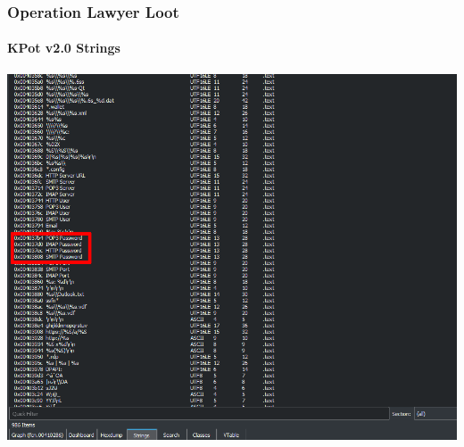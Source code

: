 \documentclass[aspectratio=169]{beamer}
\begin{document}
{
\begin{frame}
  \frametitle{Operation Lawyer Loot}
  \framesubtitle{KPot v2.0 Strings}
  \begin{center}
    \includegraphics[scale=0.95]{kpot-unpacking-12}
  \end{center}
\end{frame}
}
\end{document}
